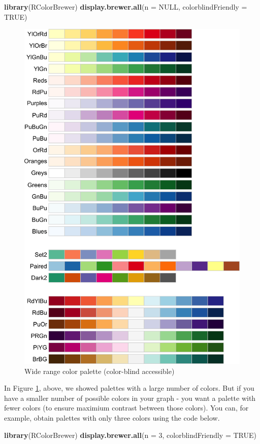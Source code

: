 \documentclass[
]{krantz}
\makeatletter
\newenvironment{Shaded}{\begin{snugshade}}{\end{snugshade}}
\newcommand{\DataTypeTok}[1]{\textcolor[rgb]{0.27,0.27,0.27}{#1}}
\newcommand{\DecValTok}[1]{\textcolor[rgb]{0.06,0.06,0.06}{#1}}
\newcommand{\KeywordTok}[1]{\textcolor[rgb]{0.27,0.27,0.27}{\textbf{#1}}}
\newcommand{\NormalTok}[1]{#1}
\newcommand{\OtherTok}[1]{\textcolor[rgb]{0.37,0.37,0.37}{#1}}
\newenvironment{kframe}{%
\medskip{}
\setlength{\fboxsep}{.8em}
 \def\at@end@of@kframe{}%
 \ifinner\ifhmode%
  \def\at@end@of@kframe{\end{minipage}}%
  \begin{minipage}{\columnwidth}%
 \fi\fi%
 \def\FrameCommand##1{\hskip\@totalleftmargin \hskip-\fboxsep
 \colorbox{shadecolor}{##1}\hskip-\fboxsep
     \hskip-\linewidth \hskip-\@totalleftmargin \hskip\columnwidth}%
 \MakeFramed {\advance\hsize-\width
   \@totalleftmargin\z@ \linewidth\hsize
   \@setminipage}}%
 {\par\unskip\endMakeFramed%
 \at@end@of@kframe}
\renewenvironment{Shaded}{\begin{kframe}}{\end{kframe}}
\makeatother
\begin{document}
\begin{Shaded}
\begin{Highlighting}[]
\KeywordTok{library}\NormalTok{(RColorBrewer)}
\KeywordTok{display.brewer.all}\NormalTok{(}\DataTypeTok{n =} \OtherTok{NULL}\NormalTok{, }\DataTypeTok{colorblindFriendly =} \OtherTok{TRUE}\NormalTok{)}
\end{Highlighting}
\end{Shaded}

\begin{figure}
\includegraphics[width=0.7\linewidth,height=0.7\textheight]{ch_graphing/images/colors_all} \caption{Wide range color palette (color-blind accessible)}\label{fig:colorpal}
\end{figure}

\newpage

In Figure \ref{fig:colorpal}, above, we showed palettes with a large number of colors. But if you have a smaller number of possible colors in your graph - you want a palette with fewer colors (to ensure maximium contrast between those colors). You can, for example, obtain palettes with only three colors using the code below.

\begin{Shaded}
\begin{Highlighting}[]
\KeywordTok{library}\NormalTok{(RColorBrewer)}
\KeywordTok{display.brewer.all}\NormalTok{(}\DataTypeTok{n =} \DecValTok{3}\NormalTok{, }\DataTypeTok{colorblindFriendly =} \OtherTok{TRUE}\NormalTok{)}
\end{Highlighting}
\end{Shaded}
\end{document}
